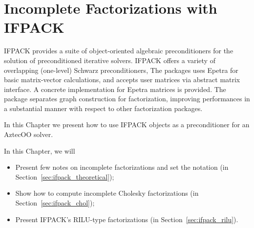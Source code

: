% 
% 
% 
%  
%  
% 

\section{Incomplete Factorizations with IFPACK}
\label{chap:ifpack}

IFPACK provides a suite of object-oriented algebraic preconditioners for
the solution of preconditioned iterative solvers. IFPACK offers a
variety of overlapping (one-level) Schwarz preconditioners, The packages
uses Epetra for basic matrix-vector calculations, and accepts user
matrices via abstract matrix interface. A concrete implementation for
Epetra matrices is provided. The package separates graph construction
for factorization, improving performances in a substantial manner with
respect to other factorization packages.

In this Chapter we present how to use IFPACK objects as a preconditioner
for an AztecOO solver. 

In this Chapter, we will
\begin{itemize}
\item Present few notes on incomplete factorizations and set the
  notation (in Section~\ref{sec:ifpack_theoretical});
\item Show how to compute incomplete Cholesky factorizations (in
  Section~\ref{sec:ifpack_chol});
\item Present IFPACK's RILU-type factorizations (in
  Section~\ref{sec:ifpack_rilu}).
\end{itemize}

